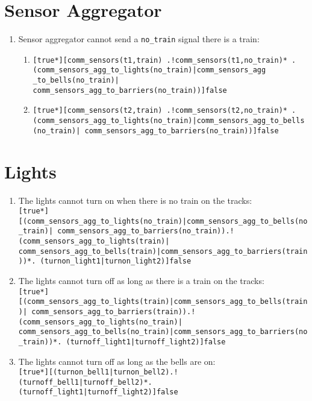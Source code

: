 \documentclass[final]{report}
\begin{document}
\section{Sensor Aggregator}
\label{sec:translated-requirements-sensor-aggregator}

\begin{enumerate}
\item Sensor aggregator cannot send a \texttt{no\_train} signal there is a train:
\begin{enumerate}[label=\roman*]
\item \texttt{[true*][comm\_sensors(t1,train) .!comm\_sensors(t1,no\_train)* . (comm\_sensors\_agg\_to\_lights(no\_train)|comm\_sensors\_agg \_to\_bells(no\_train)| comm\_sensors\_agg\_to\_barriers(no\_train))]false} 

\item \texttt{[true*][comm\_sensors(t2,train) .!comm\_sensors(t2,no\_train)* . (comm\_sensors\_agg\_to\_lights(no\_train)|comm\_sensors\_agg\_to\_bells(no\_train)| comm\_sensors\_agg\_to\_barriers(no\_train))]false}

\end{enumerate}

\end{enumerate}

\section{Lights}
\label{sec:translated-requirements-lights}

\begin{enumerate}
    \item The lights cannot turn on when there is no train on the tracks:\\
        \texttt{[true*][(comm\_sensors\_agg\_to\_lights(no\_train)|comm\_sensors\_agg\_to\_bells(no\_train)| comm\_sensors\_agg\_to\_barriers(no\_train)).!(comm\_sensors\_agg\_to\_lights(train)| comm\_sensors\_agg\_to\_bells(train)|comm\_sensors\_agg\_to\_barriers(train))*. (turnon\_light1|turnon\_light2)]false}

    \item The lights cannot turn off as long as there is a train on the tracks:\\
        \texttt{[true*][(comm\_sensors\_agg\_to\_lights(train)|comm\_sensors\_agg\_to\_bells(train)| comm\_sensors\_agg\_to\_barriers(train)).!(comm\_sensors\_agg\_to\_lights(no\_train)| comm\_sensors\_agg\_to\_bells(no\_train)|comm\_sensors\_agg\_to\_barriers(no\_train))*. (turnoff\_light1|turnoff\_light2)]false}

    \item The lights cannot turn off as long as the bells are on:\\
        \texttt{[true*][(turnon\_bell1|turnon\_bell2).!(turnoff\_bell1|turnoff\_bell2)*. (turnoff\_light1|turnoff\_light2)]false}
\end{enumerate}
\end{document}
